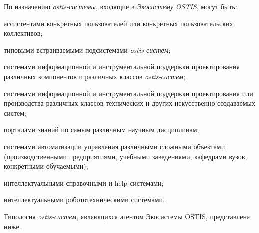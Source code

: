 По назначению \textit{ostis-системы}, входящие в \textit{Экосистему OSTIS}, могут быть:
\begin{textitemize}
    \item ассистентами конкретных пользователей или конкретных пользовательских коллективов;
    \item типовыми встраиваемыми подсистемами \textit{ostis-систем};
    \item системами информационной и инструментальной поддержки проектирования различных компонентов и различных классов \textit{ostis-систем};
    \item системами информационной и инструментальной поддержки проектирования или производства различных классов технических и других искусственно создаваемых систем;
    \item порталами знаний по самым различным научным дисциплинам;
    \item системами автоматизации управления различными сложными объектами (производственными предприятиями, учебными заведениями, кафедрами вузов, конкретными обучаемыми);
    \item интеллектуальными справочными и help-системами;
    \item интеллектуальными робототехническими системами.
\end{textitemize}
Типология \textit{ostis-систем}, являющихся агентом Экосистемы OSTIS, представлена ниже.

\begin{SCn}
\begin{scnindent}
\end{scnindent}
\begin{scnindent}
    \begin{scnindent}
    \end{scnindent}
\end{scnindent}
\end{SCn}
